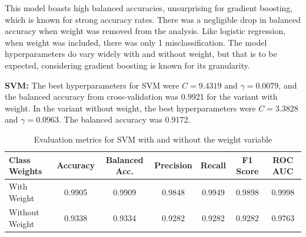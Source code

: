 \documentclass[a4paper,12pt]{article}
\begin{document}
This model boasts high balanced accuracies, unsurprising for gradient boosting, which is known for strong accuracy rates. There was a negligible drop in balanced accuracy when weight was removed from the analysis. Like logistic regression, when weight was included, there was only 1 misclassification. The model hyperparameters do vary widely with and without weight, but that is to be expected, considering gradient boosting is known for its granularity.  

\textbf{SVM:}
The best hyperparameters for SVM were $C = 9.4319$ and $\gamma = 0.0079$, and the balanced accuracy from cross-validation was 0.9921 for the variant with weight. In the variant without weight, the best hyperparameters were $C = 3.3828$ and $\gamma = 0.0963$. The balanced accuracy was 0.9172.

\begin{table}[H]
\centering
\small
\begin{tabular}{lcccccc}
\toprule
\textbf{Class Weights} & \textbf{Accuracy} & \textbf{Balanced Acc.} & \textbf{Precision} & \textbf{Recall} & \textbf{F1 Score} & \textbf{ROC AUC} \\
\midrule
With Weight & 0.9905 & 0.9909 & 0.9848 & 0.9949 & 0.9898 & 0.9998 \\
Without Weight & 0.9338 & 0.9334 & 0.9282 & 0.9282 & 0.9282 & 0.9763 \\
\bottomrule
\end{tabular}
\caption{Evaluation metrics for SVM with and without the weight variable}
\label{tab:svm_weights}
\end{table}
\end{document}
